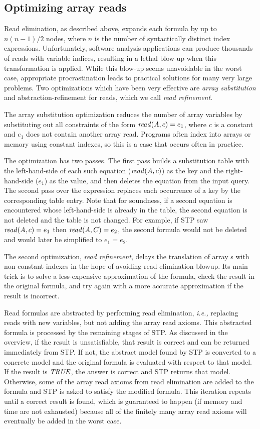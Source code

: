 \subsection{Optimizing array reads}

Read elimination, as described above, expands each formula by up to
$n(n-1)/2$ nodes, where $n$ is the number of syntactically distinct
index expressions. Unfortunately, software analysis applications can
produce thousands of reads with variable indices, resulting in a
lethal blow-up when this transformation is applied.  
While this blow-up seems unavoidable in the worst case,
appropriate procrastination leads to practical solutions for many very
large problems. Two optimizations which have been very
effective are {\it array substitution} and abstraction-refinement for
reads, which we call {\it read refinement}.

The array substitution optimization reduces the number of array
variables by substituting out all constraints of the form ${\it read}(A,
c) = e_1$, where $c$ is a constant and $e_1$ does not contain another
array read.  Programs often index into arrays or memory using constant
indexes, so this is a case that occurs often in practice.

The optimization has two passes. The first pass builds a substitution
table with the left-hand-side of each such equation (${\it read}(A, c)$)
as the key and the right-hand-side ($e_1$) as the value, and then
deletes the equation from the input query. The second pass over the
expression replaces each occurrence of a key by the corresponding
table entry. Note that for soundness, if a second
equation is encountered whose left-hand-side is already in the table, 
the second equation is not deleted and the table is not changed.
For example, if STP saw ${\it read}(A, c) = e_1$ then ${\it read}(A, C) = e_2$,
the second formula would not be deleted and would later be simplified
to $e_1 = e_2$.

The second optimization, {\it read refinement}, delays the translation
of array {\stpread}s with non-constant indexes in the hope of avoiding
read elimination blowup. Its main trick is to solve a less-expensive
approximation of the formula, check the result in the original
formula, and try again with a more accurate approximation if the
result is incorrect.

Read formulas are abstracted by performing read elimination,
{\em i.e.,} replacing reads with new variables, but not adding the array read
axioms.  This abstracted formula is processed by the remaining
stages of STP.  As discussed in the overview, if the result is
unsatisfiable, that result is correct and can be returned immediately
from STP.  If not, the abstract model found by STP is converted to a
concrete model and the original formula is evaluated with respect to
that model.  If the result is ${\it TRUE}$, the answer is correct and
STP returns that model.  Otherwise, some of the array read axioms from
read elimination are added to the formula and STP is asked to satisfy
the modified formula.
This iteration repeats until a correct result is found,
which is guaranteed to happen (if memory and time are not exhausted)
because all of the finitely many array read axioms will eventually be
added in the worst case.

